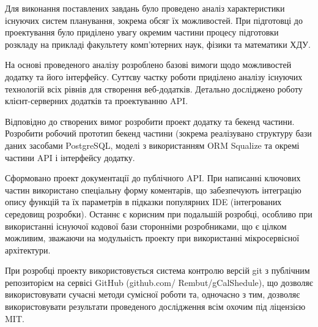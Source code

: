 
Для виконання поставлених завдань було проведено аналіз характеристики існуючих систем планування, зокрема обсяг їх можливостей. При підготовці до проектування було приділено увагу окремим частини процесу підготовки розкладу на прикладі факультету комп’ютерних наук, фізики та математики ХДУ.

На основі проведеного аналізу розроблено базові вимоги щодо можливостей додатку та його інтерфейсу.
Суттєву частку роботи приділено аналізу існуючих технологій всіх рівнів для створення веб-додатків. Детально досліджено роботу клієнт-серверних додатків та проектуванню API. 

Відповідно до створених вимог розробити проект додатку та бекенд частини. Розробити робочий прототип бекенд частини (зокрема реалізувано структуру бази даних засобами PostgreSQL, моделі з використанням ORM Squalize та окремі частини API і інтерфейсу додатку.

Сформовано проект документації до публічного API. При написанні ключових частин використано спеціальну форму коментарів, що забезпечують інтеграцію опису функцій та їх параметрів в підказки популярних IDE (інтегрованих середовищ розробки). Останнє є корисним при подальшій розробці, особливо при використанні існуючої кодової бази сторонніми розробниками, що є цілком можливим, зважаючи на модульність проекту при використанні мікросервісної архітектури.

При розробці проекту використовується система контролю версій git з публічним репозиторієм на сервісі GitHub (github.com/ Rembut/gCalShedule), що дозволяє використовувати сучасні методи сумісної роботи та, одночасно з тим, дозволяє використовувати результати проведеного дослідження всім охочим під ліцензією MIT.

\clearpage
